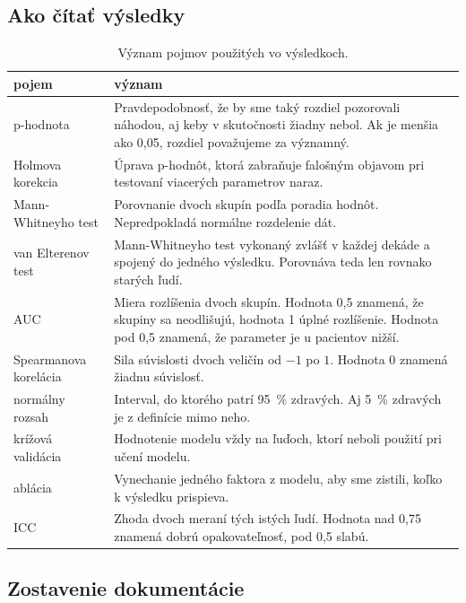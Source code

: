 \documentclass[12pt,a4paper]{article}
\begin{document}
\subsection{Ako čítať výsledky}

\begin{table}[H]
\centering\small
\caption{Význam pojmov použitých vo výsledkoch.}
\begin{tabularx}{\textwidth}{@{}>{\raggedright\arraybackslash}p{3.6cm} L@{}}
\toprule
pojem & význam \\
\midrule
p-hodnota & Pravdepodobnosť, že by sme taký rozdiel pozorovali náhodou, aj keby v skutočnosti žiadny nebol.
            Ak je menšia ako 0,05, rozdiel považujeme za významný. \\
Holmova korekcia & Úprava p-hodnôt, ktorá zabraňuje falošným objavom pri testovaní viacerých parametrov naraz. \\
Mann-Whitneyho test & Porovnanie dvoch skupín podľa poradia hodnôt. Nepredpokladá normálne rozdelenie dát. \\
van Elterenov test & Mann-Whitneyho test vykonaný zvlášť v každej dekáde a spojený do jedného výsledku.
                     Porovnáva teda len rovnako starých ľudí. \\
AUC & Miera rozlíšenia dvoch skupín. Hodnota 0,5 znamená, že skupiny sa neodlišujú, hodnota 1 úplné rozlíšenie.
      Hodnota pod 0,5 znamená, že parameter je u pacientov nižší. \\
Spearmanova korelácia & Sila súvislosti dvoch veličín od $-1$ po $1$. Hodnota 0 znamená žiadnu súvislosť. \\
normálny rozsah & Interval, do ktorého patrí 95~\% zdravých. Aj 5~\% zdravých je z definície mimo neho. \\
krížová validácia & Hodnotenie modelu vždy na ľuďoch, ktorí neboli použití pri učení modelu. \\
ablácia & Vynechanie jedného faktora z modelu, aby sme zistili, koľko k výsledku prispieva. \\
ICC & Zhoda dvoch meraní tých istých ľudí. Hodnota nad 0,75 znamená dobrú opakovateľnosť, pod 0,5 slabú. \\
\bottomrule
\end{tabularx}
\end{table}

\subsection{Zostavenie dokumentácie}
\end{document}
